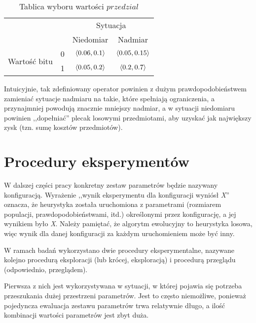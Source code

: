 \documentclass[./FM_mgr.tex]{subfiles}
\begin{document}
\begin{table}
	\caption{Tablica wyboru wartości $przedzial$ \label{table:range_choose}}
	\centering
	\begin{tabular}{cc|c|c|}
		\cline{3-4}
		\multicolumn{2}{c|}{\multirow{2}{*}{}}                   & \multicolumn{2}{c|}{Sytuacja}              \\ \cline{3-4} 
		\multicolumn{2}{c|}{}                                    & Niedomiar           & Nadmiar              \\ \hline
		\multicolumn{1}{|c|}{\multirow{2}{*}{Wartość bitu}} & 0 & $\langle0.06, 0.1\rangle$ & $\langle0.05, 0.15\rangle$ \\ \cline{2-4} 
		\multicolumn{1}{|c|}{}                              & 1 & $\langle0.05, 0.2\rangle$ & $\langle0.2, 0.7\rangle$   \\ \hline
	\end{tabular}
\end{table}

Intuicyjnie, tak zdefiniowany operator powinien z dużym prawdopodobieństwem zamieniać sytuacje nadmiaru na takie, które spełniają ograniczenia, a przynajmniej powodują znacznie mniejszy nadmiar, a w sytuacji niedomiaru powinien ,,dopełniać'' plecak losowymi przedmiotami, aby uzyskać jak największy zysk (tzn. sumę kosztów przedmiotów).


\section{Procedury eksperymentów}

W dalszej części pracy konkretny zestaw parametrów będzie nazywany konfiguracją.
Wyrażenie ,,wynik eksperymentu dla konfiguracji wyniósł \emph{X}'' oznacza, że heurystyka została uruchomiona z parametrami (rozmiarem populacji, prawdopodobieństwami, itd.) określonymi przez konfigurację, a jej wynikiem było \emph{X}.
Należy pamiętać, że algorytm ewolucyjny to heurystyka losowa, więc wynik dla danej konfiguracji za każdym uruchomieniem może być inny.

W ramach badań wykorzystano dwie procedury eksperymentalne, nazywane kolejno procedurą eksploracji (lub krócej, eksploracją) i procedurą przeglądu (odpowiednio, przeglądem).

Pierwsza z nich jest wykorzystywana w sytuacji, w której pojawia się potrzeba przeszukania dużej przestrzeni parametrów.
Jest to często niemożliwe, ponieważ pojedyncza ewaluacja zestawu parametrów trwa relatywnie długo, a ilość kombinacji wartości parametrów jest zbyt duża.
\end{document}
